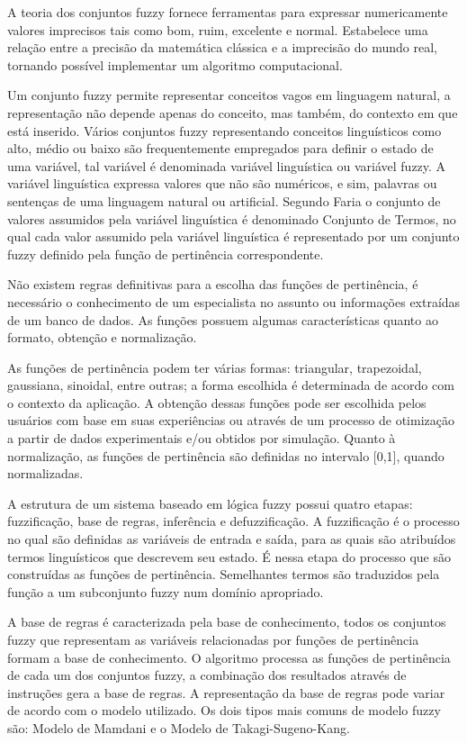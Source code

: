 \documentclass{article}
\begin{document}
A teoria dos conjuntos fuzzy fornece ferramentas para expressar
numericamente valores imprecisos tais como bom, ruim, excelente
e normal. Estabelece uma relação entre a precisão da matemática
clássica e a imprecisão do mundo real, tornando possível
implementar um algoritmo computacional.

Um conjunto fuzzy permite representar conceitos vagos em
linguagem natural, a representação não depende apenas do
conceito, mas também, do contexto em que está inserido. Vários
conjuntos fuzzy representando conceitos linguísticos como alto,
médio ou baixo são frequentemente empregados para definir o
estado de uma variável, tal variável é denominada variável
linguística ou variável fuzzy. A variável linguística expressa
valores que não são numéricos, e sim, palavras ou sentenças de
uma linguagem natural ou artificial. Segundo Faria o conjunto de
valores assumidos pela variável linguística é denominado
Conjunto de Termos, no qual cada valor assumido pela variável
linguística é representado por um conjunto fuzzy definido pela
função de pertinência correspondente.

Não existem regras definitivas para a escolha das funções de
pertinência, é necessário o conhecimento de um especialista no
assunto ou informações extraídas de um banco de dados. As
funções possuem algumas características quanto ao formato,
obtenção e normalização.

As funções de pertinência podem ter várias formas: triangular,
trapezoidal, gaussiana, sinoidal, entre outras; a forma
escolhida é determinada de acordo com o contexto da aplicação. A
obtenção dessas funções pode ser escolhida pelos usuários com
base em suas experiências ou através de um processo de
otimização a partir de dados experimentais e/ou obtidos por
simulação. Quanto à normalização, as funções de pertinência são
definidas no intervalo [0,1], quando normalizadas.

A estrutura de um sistema baseado em lógica fuzzy possui quatro
etapas: fuzzificação, base de regras, inferência e
defuzzificação. A fuzzificação é o processo no qual são
definidas as variáveis de entrada e saída, para as quais são
atribuídos termos linguísticos que descrevem seu estado. É nessa
etapa do processo que são construídas as funções de pertinência.
Semelhantes termos são traduzidos pela função a um subconjunto
fuzzy num domínio apropriado.

A base de regras é caracterizada pela base de conhecimento,
todos os conjuntos fuzzy que representam as variáveis
relacionadas por funções de pertinência formam a base de
conhecimento. O algoritmo processa as funções de pertinência de
cada um dos conjuntos fuzzy, a combinação dos resultados através
de instruções gera a base de regras. A representação da base de
regras pode variar de acordo com o modelo utilizado. Os dois
tipos mais comuns de modelo fuzzy são: Modelo de Mamdani e o
Modelo de Takagi-Sugeno-Kang.
\end{document}

